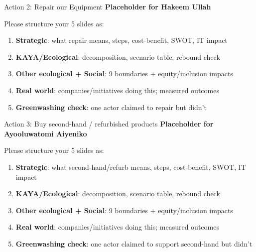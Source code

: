 \documentclass[aspectratio=169]{beamer}
\begin{document}
\begin{frame}{Action 2: Repair our Equipment}
\large
\textbf{Placeholder for Hakeem Ullah}
\vspace{0.5cm}

Please structure your 5 slides as:
\begin{enumerate}
  \item \textbf{Strategic}: what repair means, steps, cost-benefit, SWOT, IT impact
  \item \textbf{KAYA/Ecological}: decomposition, scenario table, rebound check
  \item \textbf{Other ecological + Social}: 9 boundaries + equity/inclusion impacts
  \item \textbf{Real world}: companies/initiatives doing this; measured outcomes
  \item \textbf{Greenwashing check}: one actor claimed to repair but didn't
\end{enumerate}
\end{frame}

\begin{frame}{Action 3: Buy second-hand / refurbished products}
\large
\textbf{Placeholder for Ayooluwatomi Aiyeniko}
\vspace{0.5cm}

Please structure your 5 slides as:
\begin{enumerate}
  \item \textbf{Strategic}: what second-hand/refurb means, steps, cost-benefit, SWOT, IT impact
  \item \textbf{KAYA/Ecological}: decomposition, scenario table, rebound check
  \item \textbf{Other ecological + Social}: 9 boundaries + equity/inclusion impacts
  \item \textbf{Real world}: companies/initiatives doing this; measured outcomes
  \item \textbf{Greenwashing check}: one actor claimed to support second-hand but didn't
\end{enumerate}
\end{frame}
\end{document}
